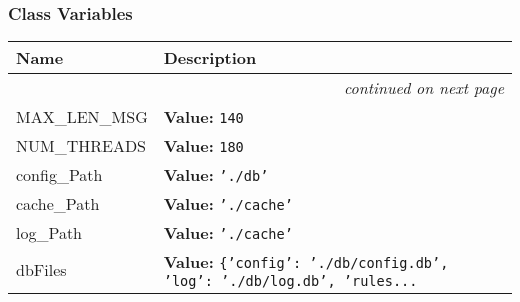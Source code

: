 
  \subsubsection{Class Variables}

    \vspace{-1cm}
\hspace{\varindent}\begin{longtable}{|p{\varnamewidth}|p{\vardescrwidth}|l}
\cline{1-2}
\cline{1-2} \centering \textbf{Name} & \centering \textbf{Description}& \\
\cline{1-2}
\endhead\cline{1-2}\multicolumn{3}{r}{\small\textit{continued on next page}}\\\endfoot\cline{1-2}
\endlastfoot\raggedright M\-A\-X\-\_\-L\-E\-N\-\_\-M\-S\-G\- & \raggedright \textbf{Value:} 
{\tt 140}&\\
\cline{1-2}
\raggedright N\-U\-M\-\_\-T\-H\-R\-E\-A\-D\-S\- & \raggedright \textbf{Value:} 
{\tt 180}&\\
\cline{1-2}
\raggedright c\-o\-n\-f\-i\-g\-\_\-P\-a\-t\-h\- & \raggedright \textbf{Value:} 
{\tt \texttt{'}\texttt{./db}\texttt{'}}&\\
\cline{1-2}
\raggedright c\-a\-c\-h\-e\-\_\-P\-a\-t\-h\- & \raggedright \textbf{Value:} 
{\tt \texttt{'}\texttt{./cache}\texttt{'}}&\\
\cline{1-2}
\raggedright l\-o\-g\-\_\-P\-a\-t\-h\- & \raggedright \textbf{Value:} 
{\tt \texttt{'}\texttt{./cache}\texttt{'}}&\\
\cline{1-2}
\raggedright d\-b\-F\-i\-l\-e\-s\- & \raggedright \textbf{Value:} 
{\tt \texttt{\{}\texttt{'}\texttt{config}\texttt{'}\texttt{: }\texttt{'}\texttt{./db/config.db}\texttt{'}\texttt{, }\texttt{'}\texttt{log}\texttt{'}\texttt{: }\texttt{'}\texttt{./db/log.db}\texttt{'}\texttt{, }\texttt{'}\texttt{rules}\texttt{...}}&\\
\cline{1-2}
\end{longtable}

